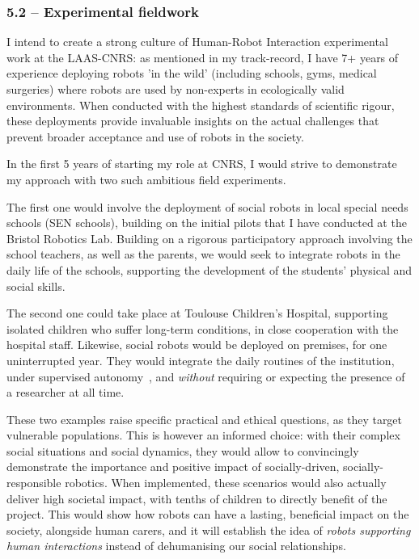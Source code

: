 \subsubsection{5.2 -- Experimental fieldwork}

I intend to create a strong culture of Human-Robot Interaction experimental work
at the LAAS-CNRS: as mentioned in my track-record, I have 7+ years of experience
deploying robots 'in the wild' (including schools, gyms, medical surgeries)
where robots are used by non-experts in ecologically valid environments. When
conducted with the highest standards of scientific rigour, these
deployments provide invaluable insights on the actual challenges that prevent
broader acceptance and use of robots in the society.



In the first 5 years of starting my role at CNRS, I would strive to demonstrate
my approach with two such ambitious field experiments.

The first one would involve the deployment of social robots in local special needs schools
(SEN schools), building on the initial pilots that I have conducted at the
Bristol Robotics Lab. Building on a rigorous participatory approach
involving the school teachers, as well as the parents, we would seek to integrate
robots in the daily life of the schools, supporting the development of the
students' physical and social skills.

The second one could take place at Toulouse Children's Hospital, supporting
isolated children who suffer long-term conditions, in close cooperation with the
hospital staff. Likewise, social robots would be deployed on premises, for one
uninterrupted year. They would integrate the daily routines of the institution,
under supervised autonomy~\parencite{senft2017supervised}, and \emph{without}
requiring or expecting the presence of a researcher at all time.

These two examples raise specific practical and ethical questions, as they
target vulnerable populations. This is however an informed choice: with their
complex social situations and social dynamics, they would allow to convincingly
demonstrate the importance and positive impact of socially-driven,
socially-responsible robotics.  When implemented, these scenarios would also
actually deliver high societal impact, with tenths of children to directly
benefit of the project. This would show how robots can have a lasting,
beneficial impact on the society, alongside human carers, and it will establish
the idea of \emph{robots supporting human interactions} instead of dehumanising
our social relationships.

